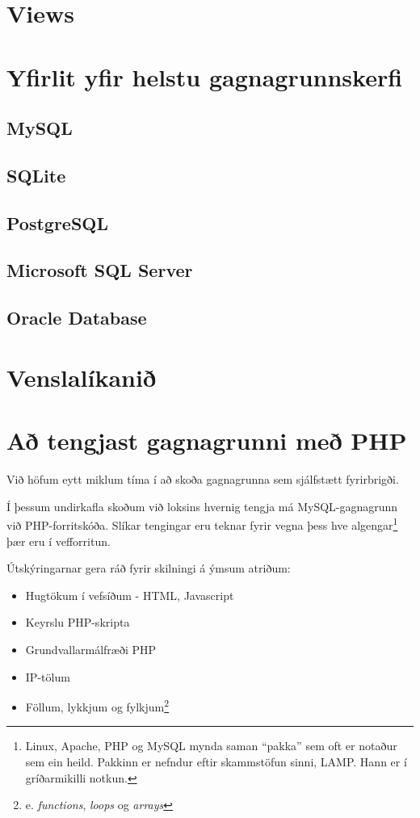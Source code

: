 \section{Views}
\section{Yfirlit yfir helstu gagnagrunnskerfi}
\label{undirkafli:helstu-gagnagrunnskerfi}
\subsection{MySQL}
\subsection{SQLite}
\subsection{PostgreSQL}
\subsection{Microsoft SQL Server}
\subsection{Oracle Database}
\section{Venslalíkanið}
\section{Að tengjast gagnagrunni með PHP}
\label{undirkafli:php}
Við höfum eytt miklum tíma í að skoða gagnagrunna sem sjálfstætt fyrirbrigði.

Í þessum undirkafla skoðum við loksins hvernig tengja má MySQL-gagnagrunn við PHP-forritskóða.
Slíkar tengingar eru teknar fyrir vegna þess hve algengar\footnote{Linux, Apache, PHP og MySQL mynda saman ``pakka'' sem oft er notaður sem ein heild. Pakkinn er nefndur eftir skammstöfun sinni, LAMP. Hann er í gríðarmikilli notkun.} þær eru í vefforritun.

Útskýringarnar gera ráð fyrir skilningi á ýmsum atriðum:
\begin{itemize}
 \item Hugtökum í vefsíðum - HTML, Javascript
 \item Keyrslu PHP-skripta
 \item Grundvallarmálfræði PHP
 \item IP-tölum
 \item Föllum, lykkjum og fylkjum\footnote{e. \emph{functions}, \emph{loops} og \emph{arrays}}
\end{itemize}
